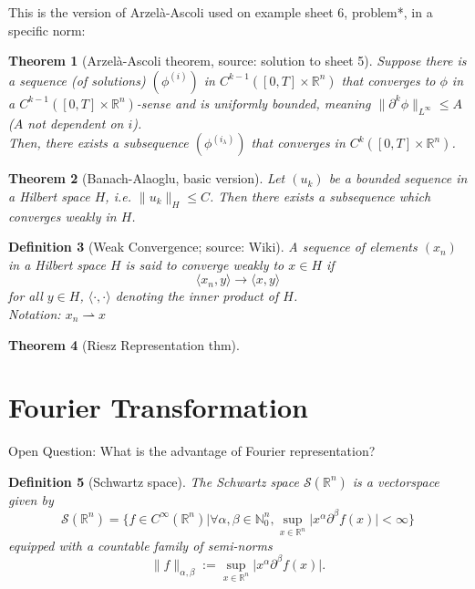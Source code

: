 \documentclass[12pt,a4paper]{article}
\newtheorem{definition}{Definition}
\newtheorem{thm}[definition]{Theorem}
\begin{document}
This is the version of Arzelà-Ascoli used on example sheet 6, problem*, in a specific norm:

\begin{thm}[Arzelà-Ascoli theorem, source: solution to sheet 5]
Suppose there is a sequence (of solutions) $(\phi^{(i)})$ in $C^{k-1}([0,T]\times \mathbb{R}^n)$ that converges to $\phi$ in a $C^{k-1}([0,T]\times \mathbb{R}^n)$-sense and is uniformly bounded, meaning $\lVert \partial ^k \phi \rVert _{L^{\infty}} \leq A$ ($A$ not dependent on $i$).\\
Then, there exists a subsequence $(\phi^{(i_{\lambda})})$ that converges in $C^{k}([0,T]\times \mathbb{R}^n)$.
\end{thm}

\begin{thm}[Banach-Alaoglu, basic version]
Let $(u_k)$ be a bounded sequence in a Hilbert space $H$, i.e. $\lVert u_k \rVert_H \leq C$. Then there exists a subsequence which converges weakly in $H$.
\end{thm}

\begin{definition}[Weak Convergence; source: Wiki]
A sequence of elements $(x_n)$ in a Hilbert space $H$ is said to converge weakly to $x\in H$ if
\begin{equation}
\langle x_n, y \rangle \rightarrow \langle x, y \rangle
\end{equation}
for all $y\in H$, $\langle \cdot , \cdot \rangle$ denoting the inner product of $H$. \\
Notation: $x_n \rightharpoonup x$
\end{definition}

\begin{thm}[Riesz Representation thm]
\end{thm}

\section{Fourier Transformation}

Open Question: What is the advantage of Fourier representation?

\begin{definition}[Schwartz space]
The Schwartz space $\mathcal{S}(\mathbb{R}^n)$ is a vectorspace given by
\begin{equation}
\mathcal{S}(\mathbb{R}^n)=\{f\in C^{\infty}(\mathbb{R}^n)\lvert \forall \alpha,\beta\in \mathbb{N}^n_0, \sup_{x\in\mathbb{R}^n}\lvert x^{\alpha}\partial^{\beta}f(x)\rvert <\infty\}
\end{equation}
equipped with a countable family of semi-norms
\begin{equation}
\lVert f \rVert_{\alpha,\beta} := \sup_{x\in\mathbb{R}^n}\lvert x^{\alpha}\partial^{\beta}f(x)\rvert.
\end{equation}
\end{definition}
\end{document}
